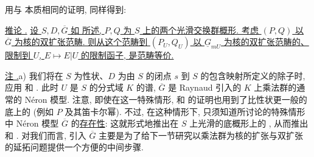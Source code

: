 用与  本质相同的证明, 同样得到:

\medskip
\noindent\underline{推论 .} \underline{设 $S,D,\overline G$ 如  所述, $P,Q$ 为 $S$ 上的两个光滑交换群概形. 考虑 $(P,Q)$ 以 $\overline G$ 为核的双扩张范畴. 则从这个范畴到 $(P_U,Q_U)$ 以 $\underline G_{mU}$ 为核的双扩张范畴的、限制到 $U$, $E\mapsto E|U$ 的限制函子, 是范畴等价.}




\medskip
\noindent\underline{注 .}\quad a) 我们将在 $S$ 为性状、$D$ 为由 $S$ 的闭点 $s$ 到 $S$ 的包含映射所定义的除子时, 应用  和 . 此时 $U$ 是 $S$ 的分式域 $K$ 的谱, $\overline G$ 是 Raynaud 引入的 $K$ 上乘法群的通常的 N\'eron 模型. 注意, 即使在这一特殊情形,  和  的证明也用到了比性状更一般的底上的  (例如 $P$ 及其笛卡尔幂). 不过, 在这种情形下, 只须知道所讨论的特殊情形中 N\'eron 模型 $\overline G$ 的\underline{存在性}: 这就形式地推出在 $S$ 上光滑的底概形上的 , 从而推出  和 . 对我们而言, 引入 $\overline G$ 主要是为了给下一节研究以乘法群为核的扩张与双扩张的延拓问题提供一个方便的中间步骤.

